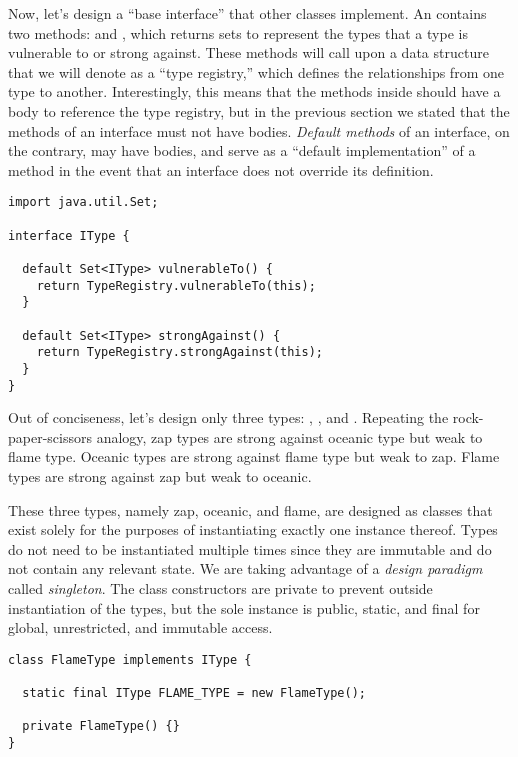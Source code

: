 Now, let's design a ``base interface'' that other classes implement. 
An  contains two methods:  and , which returns sets to represent the types that a type is vulnerable to or strong against. 
These methods will call upon a data structure that we will denote as a ``type registry,'' which defines the relationships from one type to another. 
Interestingly, this means that the methods inside  should have a body to reference the type registry, but in the previous section we stated that the methods of an interface must not have bodies. 
\emph{Default methods} of an interface, on the contrary, may have bodies, and serve as a ``default implementation'' of a method in the event that an interface does not override its definition.

\begin{lstlisting}[language=MyJava]
import java.util.Set;

interface IType {

  default Set<IType> vulnerableTo() {
    return TypeRegistry.vulnerableTo(this);
  }

  default Set<IType> strongAgainst() {
    return TypeRegistry.strongAgainst(this);
  }
}
\end{lstlisting}

Out of conciseness, let's design only three types: , , and . Repeating the rock-paper-scissors analogy, zap types are strong against oceanic type but weak to flame type. Oceanic types are strong against flame type but weak to zap. Flame types are strong against zap but weak to oceanic. 

These three types, namely zap, oceanic, and flame, are designed as classes that exist solely for the purposes of instantiating exactly one instance thereof. 
Types do not need to be instantiated multiple times since they are immutable and do not contain any relevant state. 
We are taking advantage of a \emph{design paradigm} called \emph{singleton}. 
The class constructors are private to prevent outside instantiation of the types, but the sole instance is public, static, and final for global, unrestricted, and immutable access.

\begin{lstlisting}[language=MyJava]
class FlameType implements IType {

  static final IType FLAME_TYPE = new FlameType();

  private FlameType() {}
}
\end{lstlisting}

